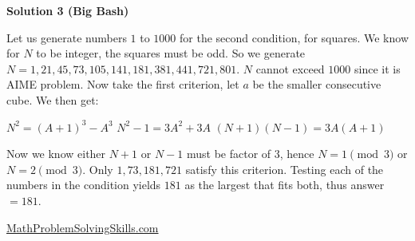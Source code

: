 \begin{enumerate}
 



\textbf{Solution 3 (Big Bash)}

Let us generate numbers $1$ to $1000$ for the second condition, for squares. We know for $N$ to be integer, the squares must be odd. So we generate $N = 1, 21, 45, 73, 105, 141, 181, 381, 441, 721, 801$. $N$ cannot exceed $1000$ since it is AIME problem. Now take the first criterion, let $a$ be the smaller consecutive cube. We then get:

 $N^2 = (A + 1)^3 - A^3$
$N^2 - 1 = 3A^2 + 3A$
$(N + 1)(N - 1) = 3A(A + 1)$

 Now we know either $N + 1$ or $N - 1$ must be factor of $3$, hence $N = 1 \pmod 3$ or$N = 2 \pmod 3$. Only $1, 73, 181, 721$ satisfy this criterion. Testing each of the numbers in the condition yields $181$ as the largest that fits both, thus answer $= \boxed{181}$.

 


 \href{https://mathproblemsolvingskills.wordpress.com/}{MathProblemSolvingSkills.com}

 


 


\end{enumerate}
